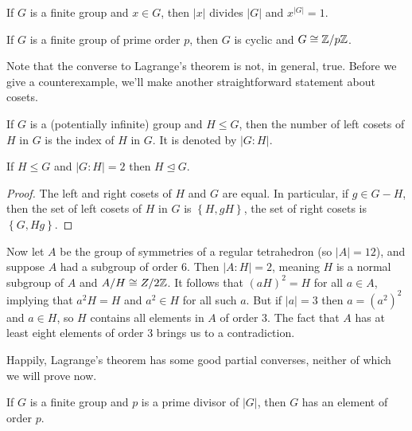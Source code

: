 \documentclass[../m171main.tex]{subfiles}
\begin{document}
\begin{corollary}[]
    If $G$ is a finite group and $x \in G$, then $|x|$ divides $|G|$ and $x^{|G|} = 1$.
\end{corollary}

\begin{corollary}[]
    If $G$ is a finite group of prime order $p$, then $G$ is cyclic and $G \cong \mathbb{Z} / p\mathbb{Z}$.
\end{corollary}

Note that the converse to Lagrange's theorem is not, in general, true.
Before we give a counterexample, we'll make another straightforward statement about cosets.

\begin{definition}
    If $G$ is a (potentially infinite) group and $H \leq G$, then the number of left cosets of $H$ in $G$ is the index of $H$ in $G$.
    It is denoted by $|G : H|$.
\end{definition}

\begin{theorem}[]
    If $H \leq G$ and $|G : H| = 2$ then $H \trianglelefteq G$.
\end{theorem}

\begin{proof}
    The left and right cosets of $H$ and $G$ are equal.
    In particular, if $g \in G - H$, then the set of left cosets of $H$ in $G$ is $\left\{ H, gH \right\}$, the set of right cosets is $\left\{ G, Hg \right\}$.
\end{proof}

Now let $A$ be the group of symmetries of a regular tetrahedron (so $|A| = 12$), and suppose $A$ had a subgroup of order 6.
Then $|A : H| = 2$, meaning $H$ is a normal subgroup of $A$ and $A / H \cong Z / 2\mathbb{Z}$.
It follows that $(aH)^2 = H$ for all $a \in A$, implying that $a^2 H = H$ and $a^2 \in H$ for all such $a$.
But if $|a| = 3$ then $a = (a^2)^2$ and $a \in H$, so $H$ contains all elements in $A$ of order $3$.
The fact that $A$ has at least eight elements of order 3 brings us to a contradiction.

Happily, Lagrange's theorem has some good partial converses, neither of which we will prove now.

\begin{theorem}
    If $G$ is a finite group and $p$ is a prime divisor of $|G|$, then $G$ has an element of order $p$.
\end{theorem}
\end{document}

